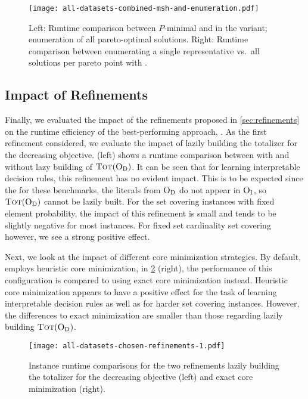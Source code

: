 \begin{figure}
  \centering
  \texttt{[image: all-datasets-combined-msh-and-enumeration.pdf]}
  \caption{Left: Runtime comparison between $P$-minimal and \algname{} in the \msh{} variant; 
    enumeration of all pareto-optimal solutions.
    Right: Runtime comparison between enumerating a single representative vs.\ all solutions per pareto point with \msh{}.}\label{fig:combined-msh-scatter-single-multi}
\end{figure}

\subsection{Impact of Refinements}

Finally, we evaluated the impact of the refinements proposed in \cref{sec:refinements} on the runtime efficiency of the best-performing approach, \msh{}.
As the first refinement considered, we evaluate the impact of lazily building the totalizer for the decreasing objective.
 (left) shows a runtime comparison between \msh{} with and without lazy building of $\textsc{Tot}(\textsc{O}_{\text{D}})$.
It can be seen that for learning interpretable decision rules, this refinement has no evident impact.
This is to be expected since the for these benchmarks, the literals from $\textsc{O}_{\text{D}}$ do not appear in $\textsc{O}_{\text{I}}$, so $\textsc{Tot}(\textsc{O}_{\text{D}})$ cannot be lazily built.
For the set covering instances with fixed element probability, the impact of this refinement is small and tends to be slightly negative for most instances.
For fixed set cardinality set covering however, we see a strong positive effect.

Next, we look at the impact of different core minimization strategies.
By default, \msh{} employs heuristic core minimization, in \cref{fig:refinements-1} (right), the performance of this configuration is compared to using exact core minimization instead.
Heuristic core minimization appears to have a positive effect for the task of learning interpretable decision rules as well as for harder set covering instances.
However, the differences to exact minimization are smaller than those regarding lazily building $\textsc{Tot}(\textsc{O}_{\text{D}})$.

\begin{figure}
    \centering
    \texttt{[image: all-datasets-chosen-refinements-1.pdf]}
    \caption{Instance runtime comparisons for the two refinements lazily building the totalizer for the decreasing objective (left) and exact core minimization (right).}\label{fig:refinements-1}
\end{figure}


